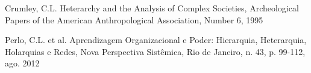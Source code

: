 \documentclass[
12pt,		%
openright,	%
twoside,  %
a4paper,			%
chapter=TITLE,		%
english,			%
french,				%
spanish,			%
brazil				%
]{USPSC-classe/USPSC}
\begin{document}
\begin{flushleft}
\begin{flushleft}
\begin{flushleft}
\begin{flushleft}
\begin{flushleft}
\begin{flushleft}
\begin{flushleft}
\begin{flushleft}
\begin{flushleft}
[CRUMLEY, 1995] Crumley, C.L. Heterarchy and the Analysis of Complex Societies, Archeological Papers of the American Anthropological Association, Number 6, 1995
\end{flushleft}


\end{flushleft}


\end{flushleft}


\end{flushleft}


\end{flushleft}


\end{flushleft}


\end{flushleft}


\end{flushleft}


\end{flushleft}


\begin{flushleft}
\begin{flushleft}
\begin{flushleft}
\begin{flushleft}
\begin{flushleft}
\begin{flushleft}
\begin{flushleft}
\begin{flushleft}
\begin{flushleft}
[PERLO et al., 2012] Perlo, C.L. et al. Aprendizagem Organizacional e Poder: Hierarquia, Heterarquia, Holarquias e Redes, Nova Perspectiva Sist\^emica, Rio de Janeiro, n. 43, p. 99-112, ago. 2012
\end{flushleft}


\end{flushleft}


\end{flushleft}


\end{flushleft}


\end{flushleft}


\end{flushleft}


\end{flushleft}


\end{flushleft}


\end{flushleft}
\end{document}
